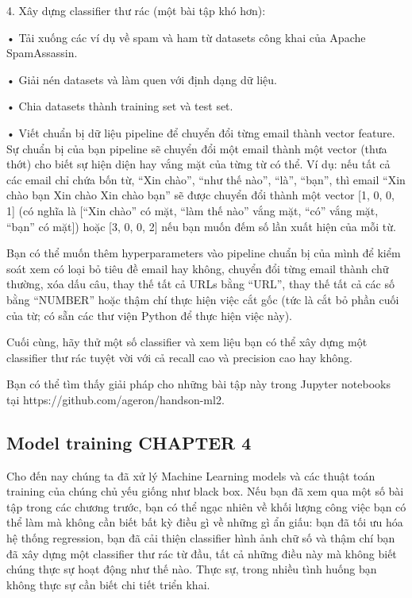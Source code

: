 4. Xây dựng classifier thư rác (một bài tập khó hơn):

• Tải xuống các ví dụ về spam và ham từ datasets công khai của Apache SpamAssassin.

• Giải nén datasets và làm quen với định dạng dữ liệu.

• Chia datasets thành training set và test set.

• Viết chuẩn bị dữ liệu pipeline để chuyển đổi từng email thành vector feature. Sự chuẩn bị của bạn pipeline sẽ chuyển đổi một email thành một vector (thưa thớt) cho biết sự hiện diện hay vắng mặt của từng từ có thể. Ví dụ: nếu tất cả các email chỉ chứa bốn từ, “Xin chào”, “như thế nào”, “là”, “bạn”, thì email “Xin chào bạn Xin chào Xin chào bạn” sẽ được chuyển đổi thành một vector [1, 0, 0, 1] (có nghĩa là [“Xin chào” có mặt, “làm thế nào” vắng mặt, “có” vắng mặt, “bạn” có mặt]) hoặc [3, 0, 0, 2] nếu bạn muốn đếm số lần xuất hiện của mỗi từ.

Bạn có thể muốn thêm hyperparameters vào pipeline chuẩn bị của mình để kiểm soát xem có loại bỏ tiêu đề email hay không, chuyển đổi từng email thành chữ thường, xóa dấu câu, thay thế tất cả URLs bằng “URL”, thay thế tất cả các số bằng “NUMBER” hoặc thậm chí thực hiện việc cắt gốc (tức là cắt bỏ phần cuối của từ; có sẵn các thư viện Python để thực hiện việc này).

Cuối cùng, hãy thử một số classifier và xem liệu bạn có thể xây dựng một classifier thư rác tuyệt vời với cả recall cao và precision cao hay không.

Bạn có thể tìm thấy giải pháp cho những bài tập này trong Jupyter notebooks tại https://github.com/ageron/handson-ml2.

\subsection{Model training CHAPTER 4}

Cho đến nay chúng ta đã xử lý Machine Learning models và các thuật toán training của chúng chủ yếu giống như black box. Nếu bạn đã xem qua một số bài tập trong các chương trước, bạn có thể ngạc nhiên về khối lượng công việc bạn có thể làm mà không cần biết bất kỳ điều gì về những gì ẩn giấu: bạn đã tối ưu hóa hệ thống regression, bạn đã cải thiện classifier hình ảnh chữ số và thậm chí bạn đã xây dựng một classifier thư rác từ đầu, tất cả những điều này mà không biết chúng thực sự hoạt động như thế nào. Thực sự, trong nhiều tình huống bạn không thực sự cần biết chi tiết triển khai.

